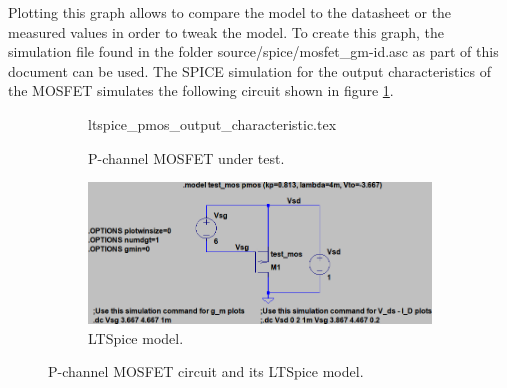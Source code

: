 \documentclass[12pt]{book}
\providecommand{\external}[1]{\textsf{#1}}
\begin{document}
Plotting this graph allows to compare the model to the datasheet or the measured values in order to tweak the model. To create this graph, the simulation file found in the folder \external{source/spice/mosfet\_gm-id.asc} as part of this document can be used. The SPICE simulation for the output characteristics of the MOSFET simulates the following circuit shown in figure \ref{fig:circuit_mosfet_output_characteristic}.
\begin{figure}[ht]
    \centering
    \begin{subfigure}{0.45\linewidth}
        \centering
        {ltspice_pmos_output_characteristic.tex}
        \caption{P-channel MOSFET under test.}
        \label{fig:circuit_mosfet_output_characteristic}
    \end{subfigure}
    \begin{subfigure}{0.45\linewidth}
        \centering
        \includegraphics[width=\linewidth]{../images/ltspice_pmos_output_characteristic.png}
        \caption{LTSpice model.}
        \label{fig:ltspice_mosfet_output_characteristic}
    \end{subfigure}
    \caption{P-channel MOSFET circuit and its LTSpice model.}
\end{figure}
\end{document}
